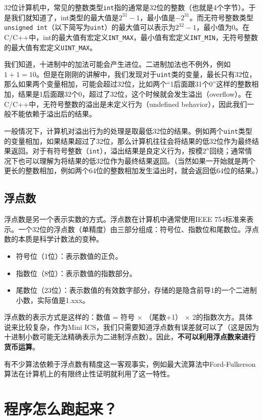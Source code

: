 \documentclass[../main.tex]{subfiles}
\begin{document}
32位计算机中，常见的整数类型\texttt{int}指的通常是32位的整数（也就是4个字节）。于是我们就知道了，int类型的最大值是$2^{31}-1$，最小值是$-2^{31}$。而无符号整数类型\texttt{unsigned int}（以下简写为\texttt{uint}）的最大值可以表示为$2^{32}-1$，最小值为0。在C/C++中，int的最大值有宏定义\texttt{INT\_MAX}，最小值有宏定义\texttt{INT\_MIN}，无符号整数的最大值有宏定义\texttt{UINT\_MAX}。

我们知道，十进制中的加法可能会产生进位。二进制加法也不例外，例如$1+1=10$。但是在刚刚的讲解中，我们发现对于\texttt{uint}类的变量，最长只有32位，那么如果两个变量相加，可能会超过32位，比如两个“1后面跟31个0”这样的整数相加，结果是1后面跟32个0，超过了32位，这个时候就会发生溢出（overflow）。在C/C++中，无符号整数的溢出是未定义行为（undefined behavior），因此我们一般不能依赖于溢出后的结果。

一般情况下，计算机对溢出行为的处理是取最低32位的结果。例如两个\texttt{uint}类型的变量相加，如果结果超过了32位，那么计算机往往会将结果的低32位作为最终结果返回。对于有符号整数（\texttt{int}），溢出结果是良定义行为，按模$2^n$回绕；通常情况下也可以理解为将结果的低32位作为最终结果返回。（当然如果一开始就是两个更长的整数相加，例如两个64位的整数相加发生溢出时，就会返回低64位的结果。）

\subsection{浮点数}

浮点数是另一个表示实数的方式。浮点数在计算机中通常使用IEEE 754标准来表示。一个32位的浮点数（单精度）由三部分组成：符号位、指数位和尾数位。浮点数的本质是科学计数法的变种。
\begin{itemize}
  \item 符号位（1位）：表示数值的正负。
  \item 指数位（8位）：表示数值的指数部分。
  \item 尾数位（23位）：表示数值的有效数字部分，存储的是隐含前导1的一个二进制小数，实际值是1.xxx。
\end{itemize}

浮点数的表示方式是这样的：数值 = 符号 $\times$ （尾数+1） $\times$ 2的指数次方。具体说来比较复杂，作为Mini ICS，我们只需要知道浮点数有误差就可以了（这是因为十进制小数可能无法精确表示为二进制浮点数）。因此，\textbf{不可以利用浮点数来进行货币运算}。

有不少算法依赖于浮点数有精度这一客观事实，例如最大流算法中Ford-Fulkerson算法在计算机上的有限终止性证明就利用了这一特性。

\section{程序怎么跑起来？}
\end{document}
